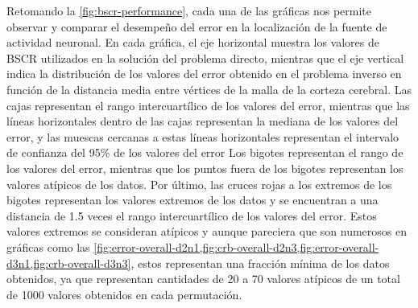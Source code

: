 Retomando la \cref{fig:bscr-performance}, cada una de las gráficas nos permite observar y comparar el desempeño del error en la localización de la fuente de actividad neuronal.
En cada gráfica, el eje horizontal muestra los valores de BSCR utilizados en la solución del problema directo, mientras que el eje vertical indica la distribución de los valores del error obtenido en el problema inverso en función de la distancia media entre vértices de la malla de la corteza cerebral.
Las cajas representan el rango intercuartílico de los valores del error, mientras que las líneas horizontales dentro de las cajas representan la mediana de los valores del error, y las muescas cercanas a estas líneas horizontales representan el intervalo de confianza del 95\% de los valores del error
Los bigotes representan el rango de los valores del error, mientras que los puntos fuera de los bigotes representan los valores atípicos de los datos.
Por último, las cruces rojas a los extremos de los bigotes representan los valores extremos de los datos y se encuentran a una distancia de 1.5 veces el rango intercuartílico de los valores del error.
Estos valores extremos se consideran atípicos y aunque pareciera que son numerosos en gráficas como las \cref{fig:error-overall-d2n1,fig:crb-overall-d2n3,fig:error-overall-d3n1,fig:crb-overall-d3n3}, estos representan una fracción mínima de los datos obtenidos, ya que representan cantidades de 20 a 70 valores atípicos de un total de 1000 valores obtenidos en cada permutación.

